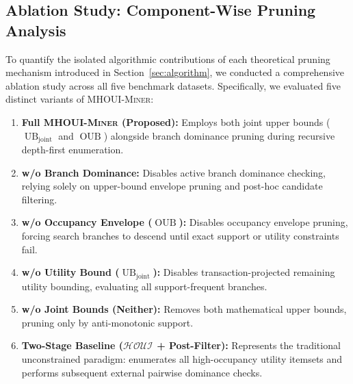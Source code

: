 \documentclass[runningheads]{llncs}
\newcommand{\HOUI}{\ensuremath{\mathcal{HOUI}}}
\newcommand{\MHOUIminer}{\textsc{MHOUI-Miner}}
\newcommand{\OUB}{\operatorname{OUB}}
\newcommand{\UBjoint}{\operatorname{UB}_{\mathrm{joint}}}
\begin{document}
\subsection{Ablation Study: Component-Wise Pruning Analysis}
\label{sec:ablation}

To quantify the isolated algorithmic contributions of each theoretical pruning mechanism introduced in Section~\ref{sec:algorithm}, we conducted a comprehensive ablation study across all five benchmark datasets.
Specifically, we evaluated five distinct variants of \MHOUIminer{}:
\begin{enumerate}
    \item \textbf{Full \MHOUIminer{} (Proposed):} Employs both joint upper bounds ($\UBjoint$ and $\OUB$) alongside branch dominance pruning during recursive depth-first enumeration.
    \item \textbf{w/o Branch Dominance:} Disables active branch dominance checking, relying solely on upper-bound envelope pruning and post-hoc candidate filtering.
    \item \textbf{w/o Occupancy Envelope ($\OUB$):} Disables occupancy envelope pruning, forcing search branches to descend until exact support or utility constraints fail.
    \item \textbf{w/o Utility Bound ($\UBjoint$):} Disables transaction-projected remaining utility bounding, evaluating all support-frequent branches.
    \item \textbf{w/o Joint Bounds (Neither):} Removes both mathematical upper bounds, pruning only by anti-monotonic support.
    \item \textbf{Two-Stage Baseline (\HOUI{} + Post-Filter):} Represents the traditional unconstrained paradigm: enumerates all high-occupancy utility itemsets and performs subsequent external pairwise dominance checks.
\end{enumerate}
\end{document}
